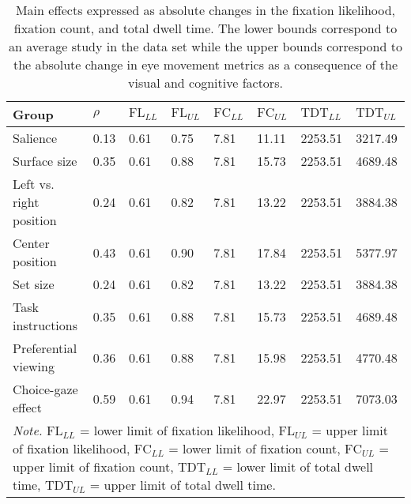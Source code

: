 \begin{table}[ht]
\centering
\caption{Main effects expressed as absolute changes in the fixation likelihood, fixation count, and total dwell time. The lower bounds correspond to an average study in the data set while the upper bounds correspond to the absolute change in eye movement metrics as a consequence of the visual and cognitive factors.} 
\label{tab:em_results}
\begingroup\small
\begin{tabular}{p{3.7cm}p{1.2cm}p{1.3cm}p{1.3cm}p{1.3cm}p{1.3cm}p{1.6cm}p{1.6cm}}
  \hline
Group & $\rho$ & $\textrm{FL}_{LL}$ & $\textrm{FL}_{UL}$ & $\textrm{FC}_{LL}$ & $\textrm{FC}_{UL}$ & $\textrm{TDT}_{LL}$ & $\textrm{TDT}_{UL}$ \\ 
  \hline
Salience & 0.13 & 0.61 & 0.75 & 7.81 & 11.11 & 2253.51 & 3217.49 \\ 
  Surface size & 0.35 & 0.61 & 0.88 & 7.81 & 15.73 & 2253.51 & 4689.48 \\ 
  Left vs. right position & 0.24 & 0.61 & 0.82 & 7.81 & 13.22 & 2253.51 & 3884.38 \\ 
  Center position & 0.43 & 0.61 & 0.90 & 7.81 & 17.84 & 2253.51 & 5377.97 \\ 
  Set size & 0.24 & 0.61 & 0.82 & 7.81 & 13.22 & 2253.51 & 3884.38 \\ 
  Task instructions & 0.35 & 0.61 & 0.88 & 7.81 & 15.73 & 2253.51 & 4689.48 \\ 
  Preferential viewing & 0.36 & 0.61 & 0.88 & 7.81 & 15.98 & 2253.51 & 4770.48 \\ 
  Choice-gaze effect & 0.59 & 0.61 & 0.94 & 7.81 & 22.97 & 2253.51 & 7073.03 \\ 
   \hline 
 \multicolumn{8}{p{0.95\textwidth}}{\scriptsize{\textit{Note.} $\textrm{FL}_{LL}$ = lower limit of fixation likelihood, $\textrm{FL}_{UL}$ = upper limit of fixation likelihood, $\textrm{FC}_{LL}$ = lower limit of fixation count, $\textrm{FC}_{UL}$ = upper limit of fixation count, $\textrm{TDT}_{LL}$ = lower limit of total dwell time, $\textrm{TDT}_{UL}$ = upper limit of total dwell time.}} 
\end{tabular}
\endgroup
\end{table}

